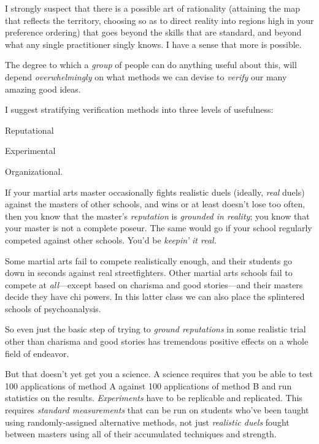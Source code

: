 \myendsectiontext


\bigskip


{
 I strongly suspect that there is a possible art of rationality
(attaining the map that reflects the territory, choosing so as to
direct reality into regions high in your preference ordering) that goes
beyond the skills that are standard, and beyond what any single
practitioner singly knows. I have a sense that more is possible. }

{
 The degree to which a \textit{group} of people can do anything
useful about this, will depend \textit{overwhelmingly} on what methods
we can devise to \textit{verify} our many amazing good ideas.}

{
 I suggest stratifying verification methods into three levels of
usefulness:}

{
 Reputational}

{
 Experimental}

{
 Organizational.}

{
 If your martial arts master occasionally fights realistic duels
(ideally, \textit{real} duels) against the masters of other schools,
and wins or at least doesn't lose too often, then you
know that the master's \textit{reputation} is
\textit{grounded in reality}; you know that your master is not a
complete poseur. The same would go if your school regularly competed
against other schools. You'd be
\textit{keepin' it real.}}

{
 Some martial arts fail to compete realistically enough, and their
students go down in seconds against real streetfighters. Other martial
arts schools fail to compete at \textit{all}{}---except based on
charisma and good stories---and their masters decide they have chi
powers. In this latter class we can also place the splintered schools
of psychoanalysis.}

{
 So even just the basic step of trying to \textit{ground
reputations} in some realistic trial other than charisma and good
stories has tremendous positive effects on a whole field of endeavor.}

{
 But that doesn't yet get you a science. A science
requires that you be able to test 100 applications of method A against
100 applications of method B and run statistics on the results.
\textit{Experiments} have to be replicable and replicated. This
requires \textit{standard measurements} that can be run on students
who've been taught using randomly-assigned alternative
methods, not just \textit{realistic duels} fought between masters using
all of their accumulated techniques and strength.}


